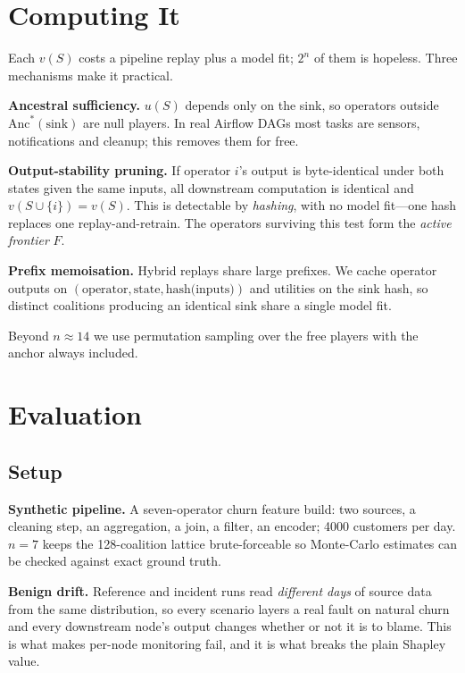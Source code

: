 \documentclass[conference]{IEEEtran}
\begin{document}
\section{Computing It}\label{sec:computing}

Each $v(S)$ costs a pipeline replay plus a model fit; $2^n$ of them is hopeless.
Three mechanisms make it practical.

\textbf{Ancestral sufficiency.} $u(S)$ depends only on the sink, so operators
outside $\mathrm{Anc}^*(\text{sink})$ are null players. In real Airflow DAGs most
tasks are sensors, notifications and cleanup; this removes them for free.

\textbf{Output-stability pruning.} If operator $i$'s output is byte-identical
under both states given the same inputs, all downstream computation is identical
and $v(S\cup\{i\}) = v(S)$. This is detectable by \emph{hashing}, with no model
fit---one hash replaces one replay-and-retrain. The operators surviving this test
form the \emph{active frontier} $F$.

\textbf{Prefix memoisation.} Hybrid replays share large prefixes. We cache
operator outputs on $(\text{operator}, \text{state}, \text{hash(inputs)})$ and
utilities on the sink hash, so distinct coalitions producing an identical sink
share a single model fit.

Beyond $n \approx 14$ we use permutation sampling over the free players with the
anchor always included.

\section{Evaluation}

\subsection{Setup}

\textbf{Synthetic pipeline.} A seven-operator churn feature build: two sources, a
cleaning step, an aggregation, a join, a filter, an encoder; 4000 customers per
day. $n=7$ keeps the 128-coalition lattice brute-forceable so Monte-Carlo
estimates can be checked against exact ground truth.

\textbf{Benign drift.} Reference and incident runs read \emph{different days} of
source data from the same distribution, so every scenario layers a real fault on
natural churn and every downstream node's output changes whether or not it is to
blame. This is what makes per-node monitoring fail, and it is what breaks the
plain Shapley value.
\end{document}

